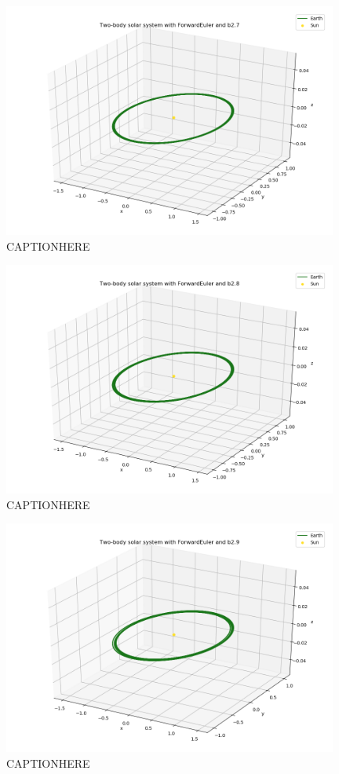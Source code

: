 \documentclass{article}
\begin{document}
    \begin{figure}[H]
        \centering
        \includegraphics[width = 11cm]{img/plot3D_S_E_F_b27.png}
        \caption{CAPTIONHERE}
        \label{fig:plot3D_S_E_F_b27}
    \end{figure}

    \begin{figure}[H]
        \centering
        \includegraphics[width = 11cm]{img/plot3D_S_E_F_b28.png}
        \caption{CAPTIONHERE}
        \label{fig:plot3D_S_E_F_b28}
    \end{figure}

    \begin{figure}[H]
        \centering
        \includegraphics[width = 11cm]{img/plot3D_S_E_F_b29.png}
        \caption{CAPTIONHERE}
        \label{fig:plot3D_S_E_F_b29}
    \end{figure}
\end{document}

